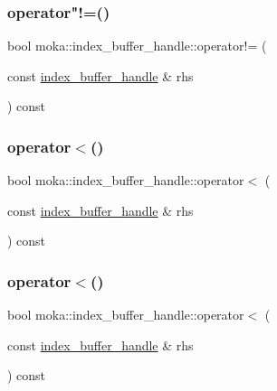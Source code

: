 \mbox{\label{structmoka_1_1index__buffer__handle_aabc5b64a1673341d50368446dc6840fd}} 
\subsubsection{\texorpdfstring{operator"!=()}{operator!=()}}
{\footnotesize\ttfamily bool moka\+::index\+\_\+buffer\+\_\+handle\+::operator!= (\begin{DoxyParamCaption}\item[{const \mbox{\hyperlink{structmoka_1_1index__buffer__handle}{index\+\_\+buffer\+\_\+handle}} \&}]{rhs }\end{DoxyParamCaption}) const}

\mbox{\label{structmoka_1_1index__buffer__handle_adfebe54fd84e937125f74e2a405eb030}} 
\subsubsection{\texorpdfstring{operator$<$()}{operator<()}\hspace{0.1cm}{\footnotesize\ttfamily [1/2]}}
{\footnotesize\ttfamily bool moka\+::index\+\_\+buffer\+\_\+handle\+::operator$<$ (\begin{DoxyParamCaption}\item[{const \mbox{\hyperlink{structmoka_1_1index__buffer__handle}{index\+\_\+buffer\+\_\+handle}} \&}]{rhs }\end{DoxyParamCaption}) const}

\mbox{\label{structmoka_1_1index__buffer__handle_adfebe54fd84e937125f74e2a405eb030}} 
\subsubsection{\texorpdfstring{operator$<$()}{operator<()}\hspace{0.1cm}{\footnotesize\ttfamily [2/2]}}
{\footnotesize\ttfamily bool moka\+::index\+\_\+buffer\+\_\+handle\+::operator$<$ (\begin{DoxyParamCaption}\item[{const \mbox{\hyperlink{structmoka_1_1index__buffer__handle}{index\+\_\+buffer\+\_\+handle}} \&}]{rhs }\end{DoxyParamCaption}) const}

